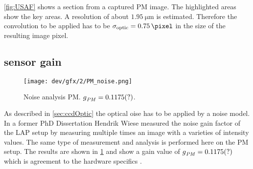 % 
\cref{fig:USAF} shows a section from a captured PM image. The highlighted areas show the key areas. A resolution of about $\SI{1.95}{\micro\meter}$ is estimated. Therefore the convolution to be applied has to be $\opticsigma = \SI{0.75}{\pixel}$ in the size of the resulting image pixel.
% 
% 
% 
\subsection{sensor gain}
%
\begin{figure}[!t]
\centering
\texttt{[image: dev/gfx/2/PM\_noise.png]}
\caption[Noise analysis]{Noise analysis PM. $\textnormal{$g$}_{\mathit{PM}} = \SI{0.1175}{}(?)$. }
\label{fig:parameterModelSimGain}
\end{figure}
% 
As described in \cref{sec:ccdOptic} the optical oise has to be applied by a noise model.
In a former PhD Dissertation \cite{Wiese:887678} Hendrik Wiese measured the noise gain factor of the \ac{LAP} setup by measuring multiple times an image with a varieties of intensity values.
The same type of measurement and analysis is performed here on the \ac{PM} setup.
The results are shown in \cref{fig:parameterModelSimGain} and show a gain value of $\textnormal{$g$}_{\mathit{PM}} = \SI{0.1175}{}(?)$ which is agreement to the hardware specifics .
% 
% 
% 
